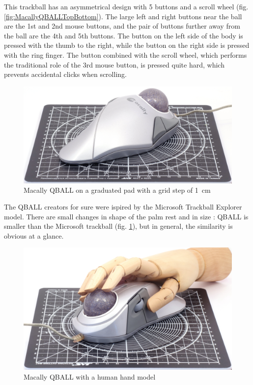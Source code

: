 \documentclass[11pt, a4paper]{article}
\begin{document}
This trackball has an asymmetrical design with 5 buttons and a scroll wheel (fig. \ref{fig:MacallyQBALLTopBottom}).
The large left and right buttons near the ball are the 1st and 2nd mouse buttons, and the pair of buttons further away from the ball are the 4th and 5th buttons.
The button on the left side of the body is pressed with the thumb to the right, while the button on the right side is pressed with the ring finger. The button combined with the scroll wheel, which performs the traditional role of the 3rd mouse button, is pressed quite hard, which prevents accidental clicks when scrolling.

\begin{figure}[h]
    \centering
    \includegraphics[scale=0.5]{2001_macally_qball/size_30.jpg}
    \caption{Macally QBALL on a graduated pad with a grid step of 1~cm}
    \label{fig:MacallyQBALLSize}
\end{figure}

The QBALL creators for sure were ispired by the Microsoft Trackball Explorer model. There are small changes in shape of the palm rest and in size \cite{review}: QBALL is smaller than the Microsoft trackball (fig. \ref{fig:MacallyQBALLSize}), but in general, the similarity is obvious at a glance.

\begin{figure}[h]
    \centering
    \includegraphics[scale=0.5]{2001_macally_qball/hand_30.jpg}
    \caption{Macally QBALL with a human hand model}
    \label{fig:MacallyQBALLHand}
\end{figure}
\end{document}
